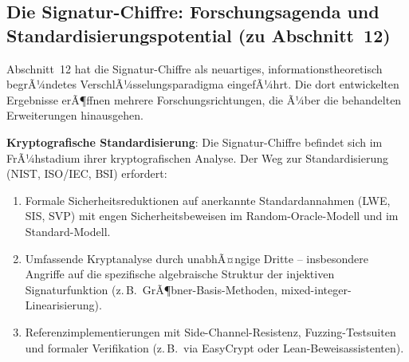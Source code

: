 ﻿\documentclass[a4paper,12pt]{article}
\theoremstyle{definition}
\begin{document}
\subsection{Die Signatur-Chiffre: Forschungsagenda und Standardisierungspotential (zu Abschnitt~12)}

Abschnitt~12 hat die Signatur-Chiffre als neuartiges,
informationstheoretisch begrÃ¼ndetes VerschlÃ¼sselungsparadigma
eingefÃ¼hrt. Die dort entwickelten Ergebnisse erÃ¶ffnen mehrere
Forschungsrichtungen, die Ã¼ber die behandelten Erweiterungen
hinausgehen.

\textbf{Kryptografische Standardisierung}:
Die Signatur-Chiffre befindet sich im FrÃ¼hstadium ihrer
kryptografischen Analyse. Der Weg zur Standardisierung
(NIST, ISO/IEC, BSI) erfordert:
\begin{enumerate}
  \item Formale Sicherheitsreduktionen auf anerkannte
    Standardannahmen (LWE, SIS, SVP) mit engen Sicherheitsbeweisen
    im Random-Oracle-Modell und im Standard-Modell.
  \item Umfassende Kryptanalyse durch unabhÃ¤ngige Dritte --
    insbesondere Angriffe auf die spezifische algebraische Struktur
    der injektiven Signaturfunktion (z.\,B.\ GrÃ¶bner-Basis-Methoden,
    mixed-integer-Linearisierung).
  \item Referenzimplementierungen mit Side-Channel-Resistenz,
    Fuzzing-Testsuiten und formaler Verifikation (z.\,B.\
    via EasyCrypt oder Lean-Beweisassistenten).
\end{enumerate}
\end{document}
